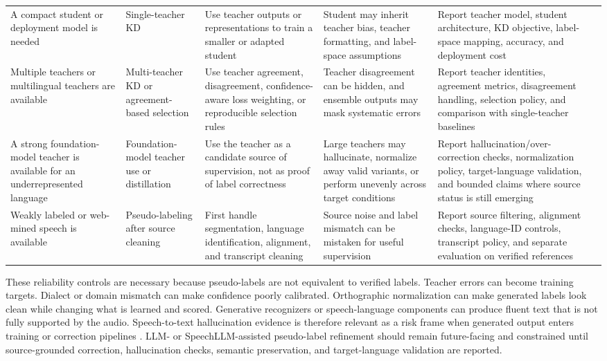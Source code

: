 \documentclass[pdflatex,sn-basic,iicol]{sn-jnl}
\theoremstyle{thmstyleone}
\theoremstyle{thmstyletwo}
\theoremstyle{thmstylethree}
\begin{document}
\begin{table}[htbp]
\begin{tabularx}{\textwidth}{YYYYYY}
A compact student or deployment model is needed & Single-teacher KD & Use teacher outputs or representations to train a smaller or adapted student & Student may inherit teacher bias, teacher formatting, and label-space assumptions & Report teacher model, student architecture, KD objective, label-space mapping, accuracy, and deployment cost & \citep{hinton2015distilling,yoon2022interkd} \\
Multiple teachers or multilingual teachers are available & Multi-teacher KD or agreement-based selection & Use teacher agreement, disagreement, confidence-aware loss weighting, or reproducible selection rules & Teacher disagreement can be hidden, and ensemble outputs may mask systematic errors & Report teacher identities, agreement metrics, disagreement handling, selection policy, and comparison with single-teacher baselines & \citep{leal21_interspeech,farooq2023must} \\
A strong foundation-model teacher is available for an underrepresented language & Foundation-model teacher use or distillation & Use the teacher as a candidate source of supervision, not as proof of label correctness & Large teachers may hallucinate, normalize away valid variants, or perform unevenly across target conditions & Report hallucination/over-correction checks, normalization policy, target-language validation, and bounded claims where source status is still emerging & \citep{pmlr-v202-radford23a,ferraz2023multilingualdistilwhisper,gandhi2023distilwhisper} \\
Weakly labeled or web-mined speech is available & Pseudo-labeling after source cleaning & First handle segmentation, language identification, alignment, and transcript cleaning & Source noise and label mismatch can be mistaken for useful supervision & Report source filtering, alignment checks, language-ID controls, transcript policy, and separate evaluation on verified references & \citep{pmlr-v202-radford23a,tian24_interspeech} \\
\bottomrule
\end{tabularx}
\end{table}

These reliability controls are necessary because pseudo-labels are not equivalent to verified labels. Teacher errors can become training targets. Dialect or domain mismatch can make confidence poorly calibrated. Orthographic normalization can make generated labels look clean while changing what is learned and scored. Generative recognizers or speech-language components can produce fluent text that is not fully supported by the audio. Speech-to-text hallucination evidence is therefore relevant as a risk frame when generated output enters training or correction pipelines \citep{koenecke2024carelesswhisper}. LLM- or SpeechLLM-assisted pseudo-label refinement should remain future-facing and constrained until source-grounded correction, hallucination checks, semantic preservation, and target-language validation are reported.
\end{document}
